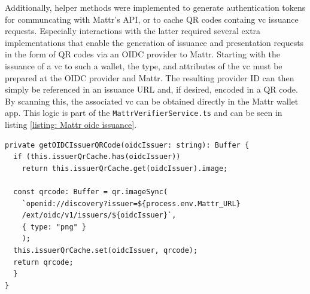     Additionally, helper methods were implemented to generate authentication tokens for communcating with Mattr's API, or to cache QR codes containg \ac{vc} issuance requests. Especially interactions with the latter required several extra implementations that enable the generation of issuance and presentation requests in the form of QR codes via an OIDC provider to Mattr. Starting with the issuance of a \ac{vc} to such a wallet, the type, and attributes of the \ac{vc} must be prepared at the OIDC provider and Mattr. The resulting provider ID can then simply be referenced in an issuance URL and, if desired, encoded in a QR code. By scanning this, the associated \ac{vc} can be obtained directly in the Mattr wallet app. This logic is part of the \texttt{MattrVerifierService.ts} and can be seen in listing \ref{listing: Mattr oidc issuance}.
    \newline
    
\begin{lstlisting}[style=ES6, caption=\acs{OIDC} issuance QR code generation, label={listing: Mattr oidc issuance}]
private getOIDCIssuerQRCode(oidcIssuer: string): Buffer {
  if (this.issuerQrCache.has(oidcIssuer)) 
    return this.issuerQrCache.get(oidcIssuer).image;

  const qrcode: Buffer = qr.imageSync(
    `openid://discovery?issuer=${process.env.Mattr_URL}
    /ext/oidc/v1/issuers/${oidcIssuer}`,
    { type: "png" }
    );
  this.issuerQrCache.set(oidcIssuer, qrcode);
  return qrcode;
  }
}\end{lstlisting}

